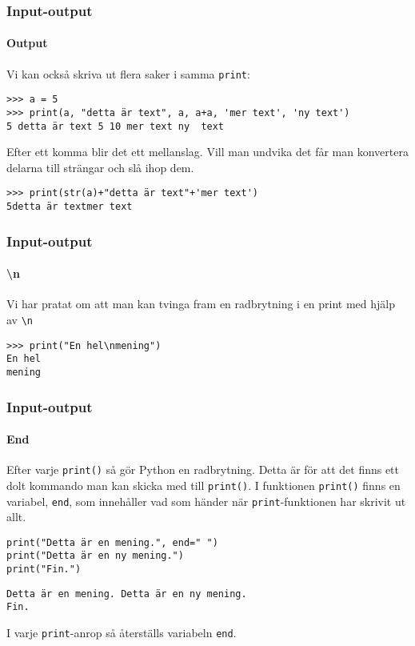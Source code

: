 \documentclass{beamer}
\begin{document}
\begin{frame}[fragile]
\frametitle{Input-output}
\framesubtitle{Output}

Vi kan också skriva ut flera saker i samma \texttt{print}:

\begin{lstlisting}
>>> a = 5
>>> print(a, "detta är text", a, a+a, 'mer text', 'ny text')
5 detta är text 5 10 mer text ny  text
\end{lstlisting}

Efter ett komma blir det ett mellanslag. Vill man undvika det får man konvertera delarna till strängar och slå ihop dem.

\begin{lstlisting}
>>> print(str(a)+"detta är text"+'mer text')
5detta är textmer text
\end{lstlisting}

\end{frame}

\begin{frame}[fragile]
\frametitle{Input-output}
\framesubtitle{\textbackslash n}

Vi har pratat om att man kan tvinga fram en radbrytning i en print med hjälp av \texttt{\textbackslash n}

\begin{lstlisting}
>>> print("En hel\nmening")
En hel
mening
\end{lstlisting}

\end{frame}

\begin{frame}[fragile]
\frametitle{Input-output}
\framesubtitle{End}

Efter varje \texttt{print()} så gör Python en radbrytning. Detta är för att det finns ett dolt kommando man kan skicka med till \texttt{print()}. I funktionen \texttt{print()} finns en variabel, \texttt{end}, som innehåller vad som händer när \texttt{print}-funktionen har skrivit ut allt.

\begin{lstlisting}
print("Detta är en mening.", end=" ")
print("Detta är en ny mening.")
print("Fin.")
\end{lstlisting}

\begin{lstlisting}
Detta är en mening. Detta är en ny mening.
Fin.
\end{lstlisting}

I varje \texttt{print}-anrop så återställs variabeln \texttt{end}.

\end{frame}
\end{document}
